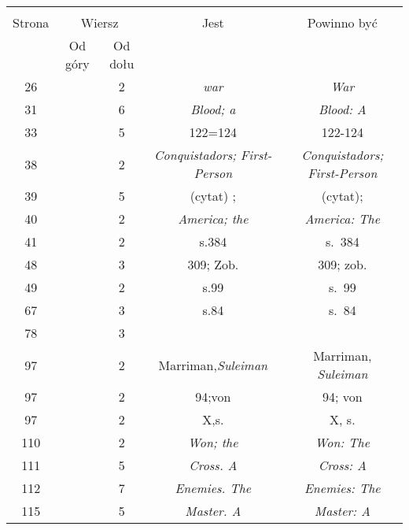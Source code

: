 \documentclass[a4paper,11pt]{article}
\begin{document}
\vspace{\spaceTwo}





\newpage
{}



\begin{center}
  \begin{tabular}{|c|c|c|c|c|}
    \hline
    & \multicolumn{2}{c|}{} & & \\
    Strona & \multicolumn{2}{c|}{Wiersz} & Jest
                              & Powinno być \\ \cline{2-3}
    & Od góry & Od dołu & & \\
    \hline
    26  & &  2 & \emph{war} & \emph{War} \\
    31  & &  6 & \emph{Blood; a} & \emph{Blood: A} \\
    33  & &  5 & 122=124 & 122-124 \\
    38  & &  2 & \emph{Conquistadors; First-Person}
           & \emph{Conquistadors; First-Person} \\
    39  & &  5 & (cytat) ; & (cytat); \\
    40  & &  2 & \emph{America; the} & \emph{America: The} \\
    41  & &  2 & s.384 & s.~384 \\
    48  & &  3 & 309; Zob. & 309; zob. \\
    49  & &  2 & s.99 & s.~99 \\
    67  & &  3 & s.84 & s.~84 \\
    78  & &  3 & & \\
    97  & &  2 & Marriman,\emph{Suleiman} & Marriman, \emph{Suleiman} \\
    97  & &  2 & 94;von & 94; von\\
    97  & &  2 & X,s.& X, s. \\
    110 & &  2 & \emph{Won; the} & \emph{Won: The} \\
    111 & &  5 & \emph{Cross. A} & \emph{Cross: A} \\
    112 & &  7 & \emph{Enemies. The} & \emph{Enemies: The} \\
    115 & &  5 & \emph{Master. A} & \emph{Master: A} \\

\end{tabular}
\end{center}
\end{document}
